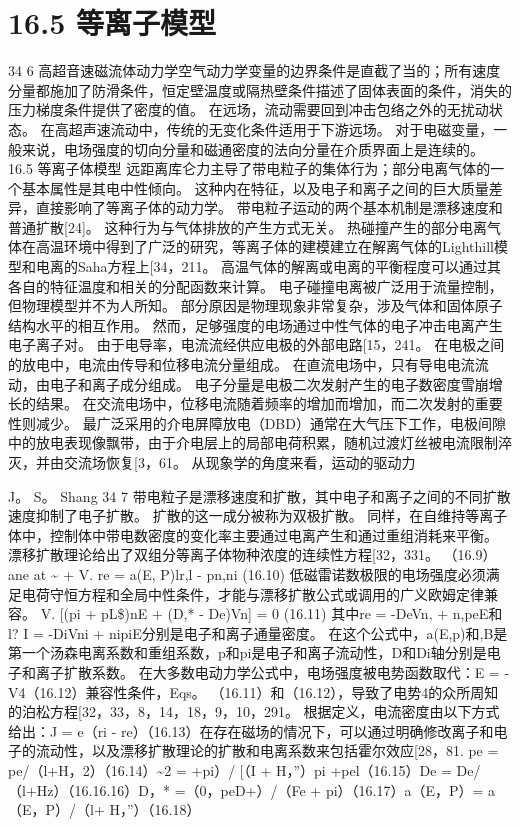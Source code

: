 \documentclass[UTF8,11pt,a4paper,openany,fontset=fandol]{ctexbook}
\begin{document}
\section{16.5 等离子模型}
34 6 高超音速磁流体动力学空气动力学变量的边界条件是直截了当的；所有速度分量都施加了防滑条件，恒定壁温度或隔热壁条件描述了固体表面的条件，消失的压力梯度条件提供了密度的值。 在远场，流动需要回到冲击包络之外的无扰动状态。 在高超声速流动中，传统的无变化条件适用于下游远场。 对于电磁变量，一般来说，电场强度的切向分量和磁通密度的法向分量在介质界面上是连续的。 16.5 等离子体模型 远距离库仑力主导了带电粒子的集体行为；部分电离气体的一个基本属性是其电中性倾向。 这种内在特征，以及电子和离子之间的巨大质量差异，直接影响了等离子体的动力学。 带电粒子运动的两个基本机制是漂移速度和普通扩散[24]。 这种行为与气体排放的产生方式无关。 热碰撞产生的部分电离气体在高温环境中得到了广泛的研究，等离子体的建模建立在解离气体的Lighthill模型和电离的Saha方程上[34，211。 高温气体的解离或电离的平衡程度可以通过其各自的特征温度和相关的分配函数来计算。 电子碰撞电离被广泛用于流量控制，但物理模型并不为人所知。 部分原因是物理现象非常复杂，涉及气体和固体原子结构水平的相互作用。 然而，足够强度的电场通过中性气体的电子冲击电离产生电子离子对。 由于电导率，电流流经供应电极的外部电路[15，241。 在电极之间的放电中，电流由传导和位移电流分量组成。 在直流电场中，只有导电电流流动，由电子和离子成分组成。 电子分量是电极二次发射产生的电子数密度雪崩增长的结果。 在交流电场中，位移电流随着频率的增加而增加，而二次发射的重要性则减少。 最广泛采用的介电屏障放电（DBD）通常在大气压下工作，电极间隙中的放电表现像飘带，由于介电层上的局部电荷积累，随机过渡灯丝被电流限制淬灭，并由交流场恢复[3，61。 从现象学的角度来看，运动的驱动力

J。 S。 Shang 34 7 带电粒子是漂移速度和扩散，其中电子和离子之间的不同扩散速度抑制了电子扩散。 扩散的这一成分被称为双极扩散。 同样，在自维持等离子体中，控制体中带电数密度的变化率主要通过电离产生和通过重组消耗来平衡。 漂移扩散理论给出了双组分等离子体物种浓度的连续性方程[32，331。 （16.9）ane at \textasciitilde{} + V. re = a(E, P)lr,l - pn,ni (16.10) 低磁雷诺数极限的电场强度必须满足电荷守恒方程和全局中性条件，才能与漂移扩散公式或调用的广义欧姆定律兼容。 V. [(pi + pL\$)nE + (D,* - De)Vn] = 0 (16.11) 其中re = -DeVn, + n,peE和l? I = -DiVni + nipiE分别是电子和离子通量密度。 在这个公式中，a(E,p)和,B是第一个汤森电离系数和重组系数，p和pi是电子和离子流动性，D和Di轴分别是电子和离子扩散系数。 在大多数电动力学公式中，电场强度被电势函数取代：E = -V4（16.12）兼容性条件，Eqs。 （16.11）和（16.12），导致了电势4的众所周知的泊松方程[32，33，8，14，18，9，10，291。 根据定义，电流密度由以下方式给出：J = e（ri - re）（16.13）在存在磁场的情况下，可以通过明确修改离子和电子的流动性，以及漂移扩散理论的扩散和电离系数来包括霍尔效应[28，81. pe = pe/（l+H，2）（16.14）\textasciitilde{}2 = +pi）/ [（I + H，”）pi +pel（16.15）De = De/（l+Hz）（16.16.16）D，* =（0，peD+）/（Fe + pi）（16.17）a（E，P）= a（E，P）/（l+ H，”）（16.18）
\end{document}
